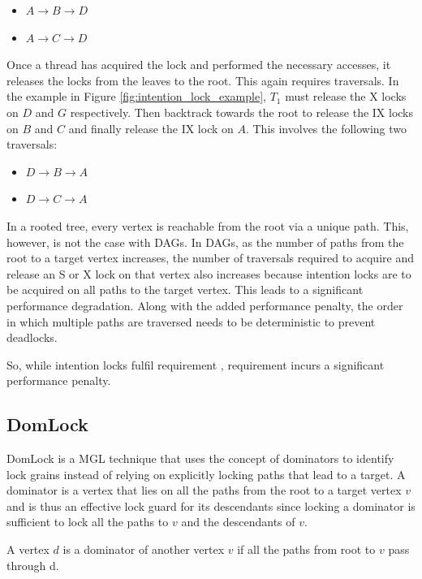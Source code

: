 \begin{itemize}
    \item $A \rightarrow B \rightarrow D$
    \item $A \rightarrow C \rightarrow D$
\end{itemize}

Once a thread has acquired the lock and performed the necessary accesses, it releases the locks from the leaves to the root. This again requires traversals. In the example in Figure \ref{fig:intention_lock_example}, $T_1$ must release the X locks on $D$ and $G$ respectively. Then backtrack towards the root to release the IX locks on $B$ and $C$ and finally release the IX lock on $A$. This involves the following two traversals:

\begin{itemize}
    \item $D \rightarrow B \rightarrow A$
    \item $D \rightarrow C \rightarrow A$
\end{itemize}




In a rooted tree, every vertex is reachable from the root via a unique path. 
This, however, is not the case with DAGs.
In DAGs, as the number of paths from the root to a target vertex increases, the number of traversals required to acquire and release an S or X lock on that vertex also increases because intention locks are to be acquired on all paths to the target vertex.
This leads to a significant performance degradation. Along with the added performance penalty, the order in which multiple paths are traversed needs to be deterministic to prevent deadlocks.  

So, while intention locks fulfil requirement \Rb, requirement \Rc incurs a significant performance penalty. 

\subsection{DomLock}
DomLock \cite{kalikar2016domlock} is a MGL technique that uses the concept of dominators to identify lock grains instead of relying on explicitly locking paths that lead to a target. A dominator is a vertex that lies on all the paths from the root to a target vertex $v$ and is thus an effective lock guard for its descendants since locking a dominator is sufficient to lock all the paths to $v$ and the descendants of $v$. 

\begin{definition}[Dominator]
    A vertex $d$ is a dominator of another vertex $v$ if all the paths from root to $v$ pass through d.
\end{definition}

